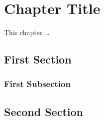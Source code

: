 \chapter{Chapter Title}
\label{ch:chapter-key}

\noindent This chapter \ldots\ %

\section{First Section}
\label{sec:first-section}
\noindent

\subsection{First Subsection}
\label{subsec:first-subsection}
\noindent

\section{Second Section}
\label{sec:second-section}
\noindent
